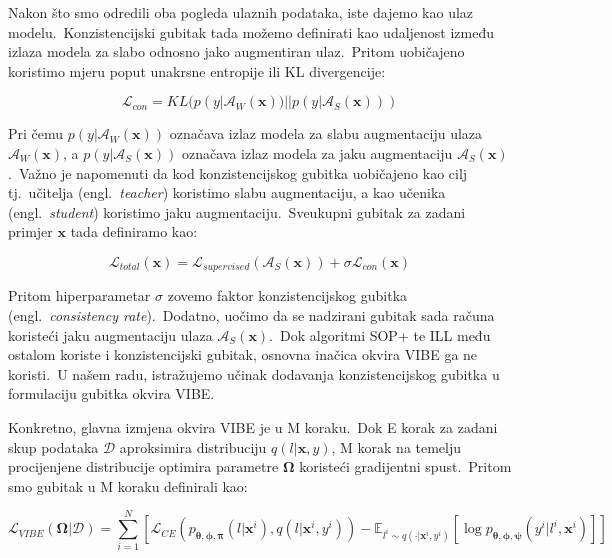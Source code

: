\documentclass[diplomskirad]{fer}
\begin{document}
\pagebreak

Nakon što smo odredili oba pogleda ulaznih podataka, iste dajemo kao ulaz modelu.\ Konzistencijski gubitak tada možemo definirati kao udaljenost između izlaza modela za slabo odnosno jako augmentiran ulaz.\ Pritom uobičajeno koristimo mjeru poput unakrsne entropije ili KL divergencije:

\begin{equation}
  \mathcal{L}_{con} = KL(p(y | \mathcal{A}_{W}(\bm{x})) || p(y | \mathcal{A}_{S}(\bm{x})))
  \label{eq:con_loss}
\end{equation}

Pri čemu $p(y | \mathcal{A}_{W}(\bm{x}))$ označava izlaz modela za slabu augmentaciju ulaza $\mathcal{A}_{W}(\bm{x})$, a $p(y | \mathcal{A}_{S}(\bm{x}))$ označava izlaz modela za jaku augmentaciju $\mathcal{A}_{S}(\bm{x})$.\ 
Važno je napomenuti da kod konzistencijskog gubitka uobičajeno kao cilj tj.\ učitelja (engl.\ \textit{teacher}) koristimo slabu augmentaciju, a kao učenika (engl.\ \textit{student}) koristimo jaku augmentaciju.\ 
Sveukupni gubitak za zadani primjer $\bm{x}$ tada definiramo kao:

\begin{equation}
  \mathcal{L}_{total}(\bm{x}) = \mathcal{L}_{supervised}(\mathcal{A}_{S}(\bm{x})) + \sigma \mathcal{L}_{con}(\bm{x})
  \label{eq:loss_with_con_loss}
\end{equation}

Pritom hiperparametar $\sigma$ zovemo faktor konzistencijskog gubitka (engl.\ \textit{consistency rate}).\ Dodatno, uočimo da se nadzirani gubitak sada računa koristeći jaku augmentaciju ulaza $\mathcal{A}_{S}(\bm{x})$.\ 
Dok algoritmi SOP+ te ILL među ostalom koriste i konzistencijski gubitak, osnovna inačica okvira VIBE ga ne koristi.\ 
U našem radu, istražujemo učinak dodavanja konzistencijskog gubitka u formulaciju gubitka okvira VIBE.\

Konkretno, glavna izmjena okvira VIBE je u M koraku.\ Dok E korak za zadani skup podataka $\mathcal{D}$ aproksimira distribuciju $q(l | \bm{x}, y)$, M korak na temelju procijenjene distribucije optimira parametre $\bm{\Omega}$ koristeći gradijentni spust.\ 
Pritom smo gubitak u M koraku definirali kao:

\begin{equation}
  \mathcal{L}_{VIBE}(\bm{\Omega} | \mathcal{D}) = \sum_{i=1}^{N} \left[ \mathcal{L}_{CE} (p_{\bm{\theta}, \bm{\phi}, \bm{\pi}}(l | \bm{x}^i), q(l | \bm{x}^i, y^i)) - \mathbb{E}_{l^i \sim q(\cdot | \bm{x}^i, y^i)} \left[ \log p_{\bm{\theta}, \bm{\phi}, \bm{\psi}}(y^i | l^i, \bm{x}^i) \right] \right]
  \label{eq:vibe_m_step_loss}
\end{equation}
\end{document}
